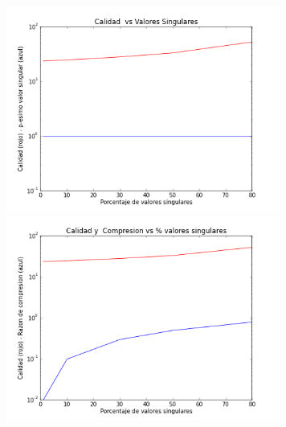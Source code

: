 \documentclass[spanish, fleqn]{article}
\begin{document}
\begin{figure}[htbp]
\begin{minipage}[b]{0.5\linewidth}
			\includegraphics[width=90mm]{./Graficos/matriz1-quality}
			\includegraphics[width=90mm]{./Graficos/matriz1-size}
			\label{fig:figura4}
		\end{minipage}
	\end{figure}
\end{document}
